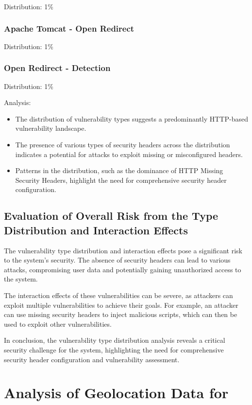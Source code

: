 Distribution: 1\%

\subsection{Apache Tomcat - Open Redirect}

Distribution: 1\%

\subsection{Open Redirect - Detection}

Distribution: 1\%

Analysis:
\begin{itemize}
\item The distribution of vulnerability types suggests a predominantly HTTP-based vulnerability landscape.
\item The presence of various types of security headers across the distribution indicates a potential for attacks to exploit missing or misconfigured headers.
\item Patterns in the distribution, such as the dominance of HTTP Missing Security Headers, highlight the need for comprehensive security header configuration.
\end{itemize}
\section{Evaluation of Overall Risk from the Type Distribution and Interaction Effects}

The vulnerability type distribution and interaction effects pose a significant risk to the system's security. The absence of security headers can lead to various attacks, compromising user data and potentially gaining unauthorized access to the system.

The interaction effects of these vulnerabilities can be severe, as attackers can exploit multiple vulnerabilities to achieve their goals. For example, an attacker can use missing security headers to inject malicious scripts, which can then be used to exploit other vulnerabilities.

In conclusion, the vulnerability type distribution analysis reveals a critical security challenge for the system, highlighting the need for comprehensive security header configuration and vulnerability assessment.

\chapter{Analysis of Geolocation Data for}

